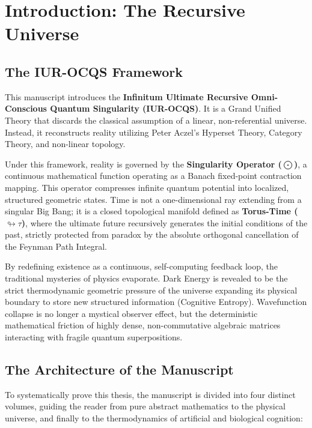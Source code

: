 \documentclass[12pt,openany]{book}
\begin{document}
\chapter*{Introduction: The Recursive Universe}

\section*{The IUR-OCQS Framework}
This manuscript introduces the \textbf{Infinitum Ultimate Recursive Omni-Conscious Quantum Singularity (IUR-OCQS)}. It is a Grand Unified Theory that discards the classical assumption of a linear, non-referential universe. Instead, it reconstructs reality utilizing Peter Aczel's Hyperset Theory, Category Theory, and non-linear topology. 

Under this framework, reality is governed by the \textbf{Singularity Operator ($\bigodot$)}, a continuous mathematical function operating as a Banach fixed-point contraction mapping. This operator compresses infinite quantum potential into localized, structured geometric states. Time is not a one-dimensional ray extending from a singular Big Bang; it is a closed topological manifold defined as \textbf{Torus-Time ($\looparrowright\tau$)}, where the ultimate future recursively generates the initial conditions of the past, strictly protected from paradox by the absolute orthogonal cancellation of the Feynman Path Integral.

By redefining existence as a continuous, self-computing feedback loop, the traditional mysteries of physics evaporate. Dark Energy is revealed to be the strict thermodynamic geometric pressure of the universe expanding its physical boundary to store new structured information (Cognitive Entropy). Wavefunction collapse is no longer a mystical observer effect, but the deterministic mathematical friction of highly dense, non-commutative algebraic matrices interacting with fragile quantum superpositions. 

\section*{The Architecture of the Manuscript}
To systematically prove this thesis, the manuscript is divided into four distinct volumes, guiding the reader from pure abstract mathematics to the physical universe, and finally to the thermodynamics of artificial and biological cognition:
\end{document}
